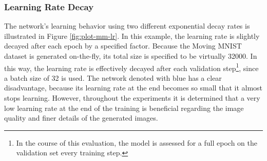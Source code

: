 \subsubsection*{Learning Rate Decay}

The network's learning behavior using two different exponential decay rates is illustrated in Figure \ref{fig:plot-mm-lr}. In this example, the learning rate is slightly decayed after each epoch by a specified factor. Because the Moving MNIST dataset is generated on-the-fly, its total size is specified to be virtually \num{32000}. In this way, the learning rate is effectively decayed after each validation step\footnote{In the course of this evaluation, the model is assessed for a full epoch on the validation set every  training step.}, since a batch size of \num{32} is used. The network denoted with blue has a clear disadvantage, because its learning rate at the end becomes so small that it almost stops learning. However, throughout the experiments it is determined that a very low learning rate at the end of the training is beneficial regarding the image quality and finer details of the generated images.

